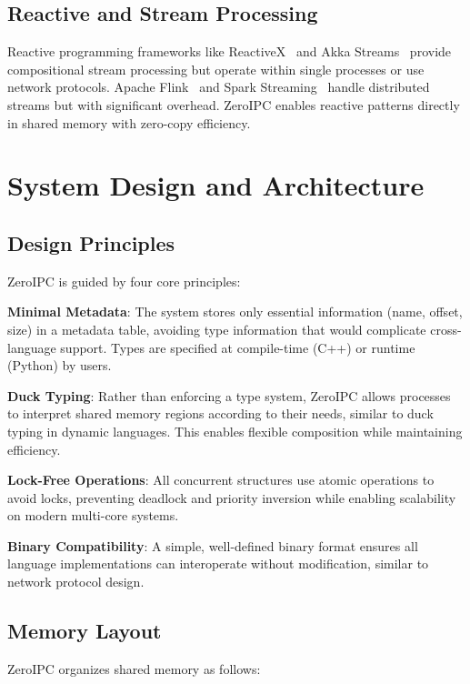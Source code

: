 \documentclass[10pt,conference]{IEEEtran}
\begin{document}
\subsection{Reactive and Stream Processing}

Reactive programming frameworks like ReactiveX~\cite{reactivex} and Akka Streams~\cite{akka} provide compositional stream processing but operate within single processes or use network protocols. Apache Flink~\cite{carbone2015apache} and Spark Streaming~\cite{zaharia2013discretized} handle distributed streams but with significant overhead. ZeroIPC enables reactive patterns directly in shared memory with zero-copy efficiency.

\section{System Design and Architecture}

\subsection{Design Principles}

ZeroIPC is guided by four core principles:

\textbf{Minimal Metadata}: The system stores only essential information (name, offset, size) in a metadata table, avoiding type information that would complicate cross-language support. Types are specified at compile-time (C++) or runtime (Python) by users.

\textbf{Duck Typing}: Rather than enforcing a type system, ZeroIPC allows processes to interpret shared memory regions according to their needs, similar to duck typing in dynamic languages. This enables flexible composition while maintaining efficiency.

\textbf{Lock-Free Operations}: All concurrent structures use atomic operations to avoid locks, preventing deadlock and priority inversion while enabling scalability on modern multi-core systems.

\textbf{Binary Compatibility}: A simple, well-defined binary format ensures all language implementations can interoperate without modification, similar to network protocol design.

\subsection{Memory Layout}

ZeroIPC organizes shared memory as follows:
\end{document}
